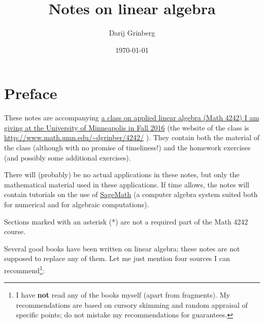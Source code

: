 \documentclass[numbers=enddot,12pt,final,onecolumn,notitlepage]{scrartcl}%
\newcounter{exer}
\theoremstyle{definition}
\begin{document}
\title{Notes on linear algebra}
\author{Darij Grinberg}
\date{
\today
}
\maketitle
\tableofcontents

\section{Preface}

These notes are accompanying \href{http://www.math.umn.edu/~dgrinber/4242/}{a
class on applied linear algebra (Math 4242) I am giving at the University of
Minneapolis in Fall 2016} (the website of the class is
\url{http://www.math.umn.edu/~dgrinber/4242/} ). They contain both the
material of the class (although with no promise of timeliness!) and the
homework exercises (and possibly some additional exercises).

There will (probably) be no actual applications in these notes, but only the
mathematical material used in these applications. If time allows, the notes
will contain tutorials on the use of \href{http://www.sagemath.org/}{SageMath}
(a computer algebra system suited both for numerical and for algebraic computations).

Sections marked with an asterisk (*) are not a required part of the Math 4242 course.

Several good books have been written on linear algebra; these notes are not
supposed to replace any of them. Let me just mention four sources I can
recommend\footnote{I have \textbf{not} read any of the books myself (apart
from fragments). My recommendations are based on cursory skimming and random
appraisal of specific points; do not mistake my recommendations for
guarantees.}:
\end{document}
